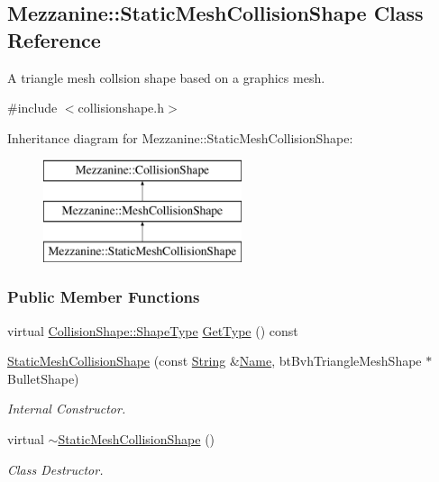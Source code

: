 \hypertarget{classMezzanine_1_1StaticMeshCollisionShape}{
\subsection{Mezzanine::StaticMeshCollisionShape Class Reference}
\label{classMezzanine_1_1StaticMeshCollisionShape}
}


A triangle mesh collsion shape based on a graphics mesh.  




{\ttfamily \#include $<$collisionshape.h$>$}

Inheritance diagram for Mezzanine::StaticMeshCollisionShape:\begin{figure}[H]
\begin{center}
\leavevmode
\includegraphics[height=3.000000cm]{classMezzanine_1_1StaticMeshCollisionShape}
\end{center}
\end{figure}
\subsubsection*{Public Member Functions}
\begin{DoxyCompactItemize}
\item 
virtual \hyperlink{classMezzanine_1_1CollisionShape_ad04186055565998879b64176d6dd100d}{CollisionShape::ShapeType} \hyperlink{classMezzanine_1_1StaticMeshCollisionShape_ae6cf497bf3a0c1db7b0f39a0513ebb79}{GetType} () const 
\item 
\hyperlink{classMezzanine_1_1StaticMeshCollisionShape_a1c565cc4d62ab7a0cd5cf55254905f05}{StaticMeshCollisionShape} (const \hyperlink{namespaceMezzanine_acf9fcc130e6ebf08e3d8491aebcf1c86}{String} \&\hyperlink{classMezzanine_1_1CollisionShape_aac524c5c56fa4d158bc071f8aecfbe79}{Name}, btBvhTriangleMeshShape $\ast$BulletShape)
\begin{DoxyCompactList}\small\item\em Internal Constructor. \item\end{DoxyCompactList}\item 
\hypertarget{classMezzanine_1_1StaticMeshCollisionShape_af9e8c6e26fd7788af907801bc0126978}{
virtual \hyperlink{classMezzanine_1_1StaticMeshCollisionShape_af9e8c6e26fd7788af907801bc0126978}{$\sim$StaticMeshCollisionShape} ()}
\label{classMezzanine_1_1StaticMeshCollisionShape_af9e8c6e26fd7788af907801bc0126978}

\begin{DoxyCompactList}\small\item\em Class Destructor. \item\end{DoxyCompactList}\end{DoxyCompactItemize}
